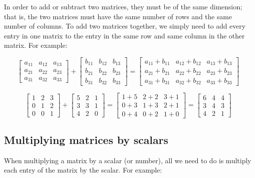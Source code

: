In order to add or subtract two matrices, they must be of the same dimension; that is, the
two matrices must have the same number of rows and the same number of columns. To add two
matrices together, we simply need to add every entry in one matrix to the entry in the
same row and same column in the other matrix. For example:


\[ 
\begin{bmatrix}
a _{11} & a _{12} & a _{13} \\
a _{21} & a _{22} & a _{23} \\
a _{31} & a _{32} & a _{33}
\end{bmatrix} +
\begin{bmatrix}
b _{11} & b _{12} & b _{13} \\
b _{21} & b _{22} & b _{23} \\
b _{31} & b _{32} & b _{33}
\end{bmatrix} =
\begin{bmatrix}
a _{11} + b _{11} & a _{12} + b _{12} & a _{13} + b _{13} \\
a _{21} + b _{21} & a _{22} + b _{22} & a _{23} + b _{23} \\
a _{31} + b _{31} & a _{32} + b _{32} & a _{33} + b _{33}
\end{bmatrix}
\]


\[
\begin{bmatrix}
1 & 2 & 3 \\
0 & 1 & 2 \\
0 & 0 & 1
\end{bmatrix} +
\begin{bmatrix}
5 & 2 & 1 \\
3 & 3 & 1 \\
4 & 2 & 0
\end{bmatrix} =
\begin{bmatrix}
1 + 5 & 2 + 2 & 3 + 1 \\
0 + 3 & 1 + 3 & 2 + 1 \\
0 + 4 & 0 + 2 & 1 + 0
\end{bmatrix} =
\begin{bmatrix}
6 & 4 & 4 \\
3 & 4 & 3 \\
4 & 2 & 1
\end{bmatrix}
\]


\subsection{Multiplying matrices by scalars}
\label{sss:mult-5bb5}
When multiplying a matrix by a scalar (or number), all we need to do is multiply each
entry of the matrix by the scalar. For example:


